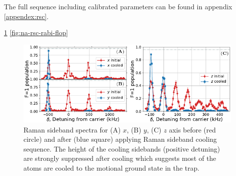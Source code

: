 The full sequence including calibrated parameters can be found in appendix \ref{appendex:rsc}.

\ref{fig:na-rsc-spectrum}
\ref{fig:na-rsc-rabi-flop}

\begin{figure}
  \centering
  \includegraphics[width=\textwidth]{figures/na_rsc_spectrum.pdf}
  \caption[Raman sideband spectra before and after cooling]{
    Raman sideband spectra for (A) $x$, (B) $y$, (C) $z$ axis before (red circle)
    and after (blue square) applying Raman sideband cooling sequence.
    The height of the cooling sidebands (positive detuning)
    are strongly suppressed after cooling which suggests most of the atoms are cooled
    to the motional ground state in the trap.
    \label{fig:na-rsc-spectrum}}
\end{figure}

